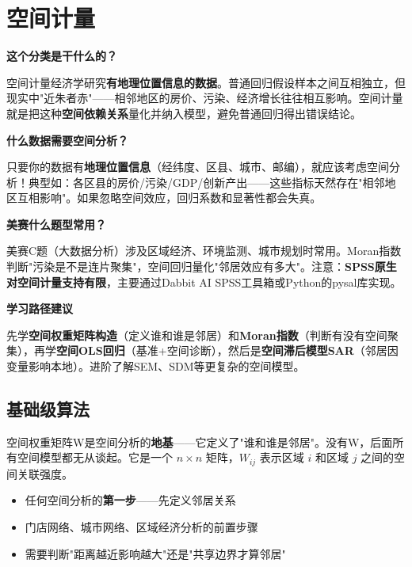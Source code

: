 \chapter{空间计量}

\begin{chapteroverview}
\textbf{这个分类是干什么的？}

空间计量经济学研究\textbf{有地理位置信息的数据}。普通回归假设样本之间互相独立，但现实中"近朱者赤"——相邻地区的房价、污染、经济增长往往相互影响。空间计量就是把这种\textbf{空间依赖关系}量化并纳入模型，避免普通回归得出错误结论。

\textbf{什么数据需要空间分析？}

只要你的数据有\textbf{地理位置信息}（经纬度、区县、城市、邮编），就应该考虑空间分析！典型如：各区县的房价/污染/GDP/创新产出——这些指标天然存在"相邻地区互相影响"。如果忽略空间效应，回归系数和显著性都会失真。

\textbf{美赛什么题型常用？}

美赛C题（大数据分析）涉及区域经济、环境监测、城市规划时常用。Moran指数判断"污染是不是连片聚集"，空间回归量化"邻居效应有多大"。注意：\textbf{SPSS原生对空间计量支持有限}，主要通过Dabbit AI SPSS工具箱或Python的pysal库实现。

\textbf{学习路径建议}

先学\textbf{空间权重矩阵构造}（定义谁和谁是邻居）和\textbf{Moran指数}（判断有没有空间聚集），再学\textbf{空间OLS回归}（基准+空间诊断），然后是\textbf{空间滞后模型SAR}（邻居因变量影响本地）。进阶了解SEM、SDM等更复杂的空间模型。
\end{chapteroverview}

\section{基础级算法}


\begin{algointro}
空间权重矩阵W是空间分析的\textbf{地基}——它定义了"谁和谁是邻居"。没有W，后面所有空间模型都无从谈起。它是一个 $n\times n$ 矩阵，$W_{ij}$ 表示区域 $i$ 和区域 $j$ 之间的空间关联强度。
\end{algointro}

\begin{algoscene}
\begin{itemize}
    \item 任何空间分析的\textbf{第一步}——先定义邻居关系
    \item 门店网络、城市网络、区域经济分析的前置步骤
    \item 需要判断"距离越近影响越大"还是"共享边界才算邻居"
\end{itemize}
\end{algoscene}

